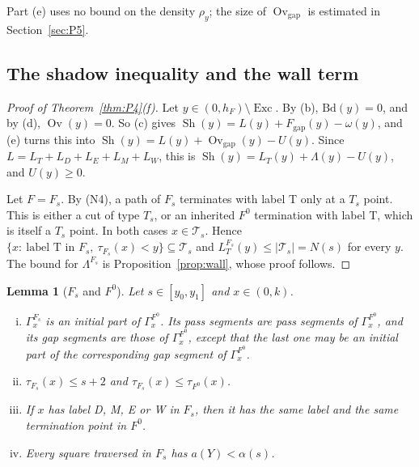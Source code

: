 \documentclass[11pt]{amsart}
\newcommand{\cT}{\mathcal T}
\newcommand{\Sh}{\operatorname{Sh}}
\newcommand{\Ov}{\operatorname{Ov}}
\newcommand{\Ovgap}{\operatorname{Ov}_{\mathrm{gap}}}
\newcommand{\Fgap}{F_{\mathrm{gap}}}
\newcommand{\Exc}{\operatorname{Exc}}
\newcommand{\Lam}{\Lambda}
\newcommand{\Fz}{F^{0}}
\newcommand{\Fs}{F_{s}}
\newtheorem{lemma}[theorem]{Lemma}
\theoremstyle{definition}
\theoremstyle{remark}
\numberwithin{equation}{section}
\begin{document}
Part (e) uses no bound on the density $\rho_y$; the size of $\Ovgap$ is estimated in Section~\ref{sec:P5}.

\subsection{The shadow inequality and the wall term}\label{ssec:P4-f}

\begin{proof}[Proof of Theorem~\ref{thm:P4}(f)]
Let $y\in(0,h_F)\setminus\Exc$. By (b), $\mathrm{Bd}(y)=0$, and by (d), $\Ov(y)=0$. So (c) gives $\Sh(y)=L(y)+\Fgap(y)-\omega(y)$, and (e) turns this into $\Sh(y)=L(y)+\Ovgap(y)-U(y)$. Since $L=L_T+L_D+L_E+L_M+L_W$, this is $\Sh(y)=L_T(y)+\Lam(y)-U(y)$, and $U(y)\ge0$.

Let $F=\Fs$. By (N4), a path of $\Fs$ terminates with label T only at a $T_s$ point. This is either a cut of type $T_s$, or an inherited $\Fz$ termination with label T, which is itself a $T_s$ point. In both cases $x\in\cT_s$. Hence $\{x:\ \text{label T in }\Fs,\ \tau_{\Fs}(x)<y\}\subseteq\cT_s$ and $L^{\Fs}_T(y)\le|\cT_s|=N(s)$ for every $y$. The bound for $\Lam^{\Fs}$ is Proposition~\ref{prop:wall}, whose proof follows.
\end{proof}

\begin{lemma}[$\Fs$ and $\Fz$]\label{lem:P4-FsF0}
Let $s\in[y_0,y_1]$ and $x\in(0,k)$.
\begin{enumerate}[(i)]
\item $\Gamma^{\Fs}_x$ is an initial part of $\Gamma^{\Fz}_x$. Its pass segments are pass segments of $\Gamma^{\Fz}_x$, and its gap segments are those of $\Gamma^{\Fz}_x$, except that the last one may be an initial part of the corresponding gap segment of $\Gamma^{\Fz}_x$.
\item $\tau_{\Fs}(x)\le s+2$ and $\tau_{\Fs}(x)\le\tau_{\Fz}(x)$.
\item If $x$ has label D, M, E or W in $\Fs$, then it has the same label and the same termination point in $\Fz$.
\item Every square traversed in $\Fs$ has $a(Y)<\alpha(s)$.
\end{enumerate}
\end{lemma}
\end{document}
